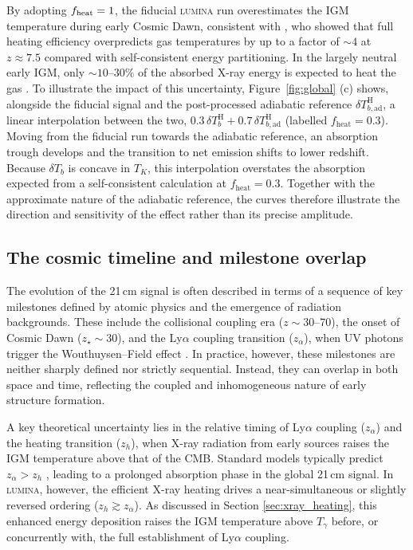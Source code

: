 \documentclass[apj,twocolumn, appendixfloats, twocolappendix, numberedappendix, tighten]{openjournal}
\DeclareRobustCommand{\lumina}{\mbox{\textsc{lumina}}\xspace}
\begin{document}
By adopting $f_{\rm heat} = 1$, the fiducial \lumina run overestimates the IGM temperature during early Cosmic Dawn, consistent with \citet{Eide2020}, who showed that full heating efficiency overpredicts gas temperatures by up to a factor of $\sim 4$ at $z \approx 7.5$ compared with self-consistent energy partitioning. In the largely neutral early IGM, only $\sim 10$--$30\%$ of the absorbed X-ray energy is expected to heat the gas \citep{Shull1985, Furlanetto2010}. To illustrate the impact of this uncertainty, Figure~\ref{fig:global} (c) shows, alongside the fiducial signal and the post-processed adiabatic reference $\delta T^\mathrm{H}_{b,\mathrm{ad}}$, a linear interpolation between the two, $0.3\,\delta T_b^\mathrm{H} + 0.7\,\delta T_{b,\mathrm{ad}}^\mathrm{H}$ (labelled $f_\mathrm{heat} = 0.3$). Moving from the fiducial run towards the adiabatic reference, an absorption trough develops and the transition to net emission shifts to lower redshift. Because $\delta T_b$ is concave in $T_K$, this interpolation overstates the absorption expected from a self-consistent calculation at $f_\mathrm{heat} = 0.3$. Together with the approximate nature of the adiabatic reference, the curves therefore illustrate the direction and sensitivity of the effect rather than its precise amplitude.


\subsection{The cosmic timeline and milestone overlap} \label{sec:times}

The evolution of the 21\,cm signal is often described in terms of a sequence of key milestones defined by atomic physics and the emergence of radiation backgrounds. These include the collisional coupling era ($z \sim 30$--70), the onset of Cosmic Dawn ($z_\star \sim 30$), and the Ly$\alpha$ coupling transition ($z_\alpha$), when UV photons trigger the Wouthuysen--Field effect \citep{Wouthuysen1952, Field1958}. In practice, however, these milestones are neither sharply defined nor strictly sequential. Instead, they can overlap in both space and time, reflecting the coupled and inhomogeneous nature of early structure formation.


A key theoretical uncertainty lies in the relative timing of Ly$\alpha$ coupling ($z_\alpha$) and the heating transition ($z_h$), when X-ray radiation from early sources raises the IGM temperature above that of the CMB. Standard models typically predict $z_\alpha > z_h$ \citep[][]{Furlanetto2006, Mesinger2011, Pritchard2012, Mesinger2019}, leading to a prolonged absorption phase in the global 21\,cm signal. In \lumina, however, the efficient X-ray heating drives a near-simultaneous or slightly reversed ordering ($z_h \gtrsim z_\alpha$). As discussed in Section \ref{sec:xray_heating}, this enhanced energy deposition raises the IGM temperature above $T_\gamma$ before, or concurrently with, the full establishment of Ly$\alpha$ coupling.
\end{document}
